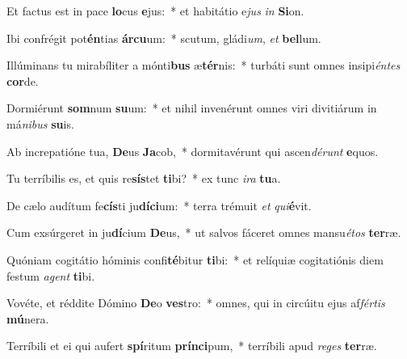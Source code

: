 \item Et factus est in pace \textbf{lo}cus \textbf{e}jus:~* et habitátio e\textit{jus} \textit{in} \textbf{Si}on.
\item Ibi confrégit pot\textbf{én}tias \textbf{ár}\textbf{cu}um:~* scutum, gládi\textit{um}, \textit{et} \textbf{bel}lum.
\item Illúminans tu mirabíliter a mónti\textbf{bus} æ\textbf{tér}nis:~* turbáti sunt omnes insipi\textit{én}\textit{tes} \textbf{cor}de.
\item Dormiérunt \textbf{som}num \textbf{su}um:~* et nihil invenérunt omnes viri divitiárum in má\textit{ni}\textit{bus} \textbf{su}is.
\item Ab increpatióne tua, \textbf{De}us \textbf{Ja}cob,~* dormitavérunt qui ascen\textit{dé}\textit{runt} \textbf{e}quos.
\item Tu terríbilis es, et quis re\textbf{sís}tet \textbf{ti}bi?~* ex tunc \textit{i}\textit{ra} \textbf{tu}a.
\item De cælo audítum fe\textbf{cís}ti ju\textbf{dí}\textbf{ci}um:~* terra trémuit \textit{et} \textit{qui}\textbf{é}vit.
\item Cum exsúrgeret in ju\textbf{dí}cium \textbf{De}us,~* ut salvos fáceret omnes mansu\textit{é}\textit{tos} \textbf{ter}ræ.
\item Quóniam cogitátio hóminis confi\textbf{té}bitur \textbf{ti}bi:~* et relíquiæ cogitatiónis diem festum \textit{a}\textit{gent} \textbf{ti}bi.
\item Vovéte, et réddite Dómino \textbf{De}o \textbf{ves}tro:~* omnes, qui in circúitu ejus af\textit{fér}\textit{tis} \textbf{mú}nera.
\item Terríbili et ei qui aufert \textbf{spí}ritum \textbf{prín}\textbf{ci}pum,~* terríbili apud \textit{re}\textit{ges} \textbf{ter}ræ.
